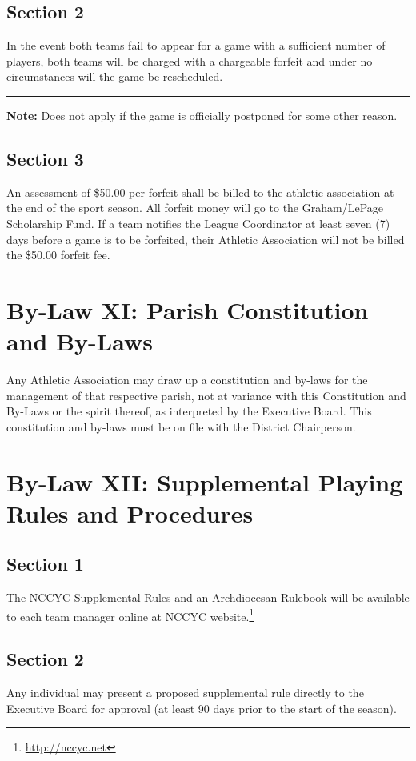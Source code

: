\subsection{Section 2}
\label{ssec:bylaw-10-2}
In the event both teams fail to appear for a game with a sufficient number of players, both teams will be charged with a chargeable forfeit and under no circumstances will the game be rescheduled.  
\plainbreak{1}
\textbf{Note:}  Does not apply if the game is officially postponed for some other reason.

\subsection{Section 3}
\label{ssec:bylaw-10-3}
An assessment of \$50.00 per forfeit shall be billed to the athletic association at the end of the sport season.  All forfeit money will go to the Graham/LePage Scholarship Fund.  If a team notifies the League Coordinator at least seven (7) days before a game is to be forfeited, their Athletic Association will not be billed the \$50.00 forfeit fee.

\section{By-Law XI: Parish Constitution and By-Laws}
Any Athletic Association may draw up a constitution and by-laws for the management of that respective parish, not at variance with this Constitution and By-Laws or the spirit thereof, as inter­preted by the Executive Board.  This constitution and by-laws must be on file with the District Chairperson.

\section{By-Law XII: Supplemental Playing Rules and Procedures}
\label{sec:bylaw-12}
\subsection{Section 1}
\label{ssec:bylaw-12-1}
The NCCYC Supplemental Rules and an Archdiocesan Rulebook will be available to each team manager online at NCCYC website.\footnote{\url{http://nccyc.net}}

\subsection{Section 2}
\label{ssec:bylaw-12-2}
Any individual may present a proposed supplemental rule directly to the Executive Board for approval (at least 90 days prior to the start of the season).
 
